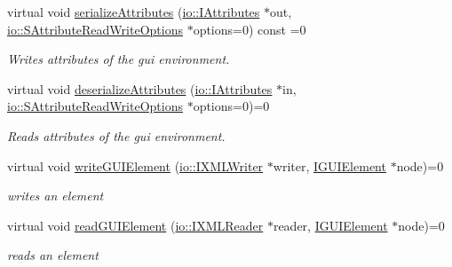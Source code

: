 \begin{DoxyCompactItemize}
virtual void \hyperlink{classirr_1_1gui_1_1IGUIEnvironment_a6342ec41dcd9fbd3f587dce369d11b34}{serialize\+Attributes} (\hyperlink{classirr_1_1io_1_1IAttributes}{io\+::\+I\+Attributes} $\ast$out, \hyperlink{structirr_1_1io_1_1SAttributeReadWriteOptions}{io\+::\+S\+Attribute\+Read\+Write\+Options} $\ast$options=0) const =0
\begin{DoxyCompactList}\small\item\em Writes attributes of the gui environment. \end{DoxyCompactList}\item 
\mbox{\label{classirr_1_1gui_1_1IGUIEnvironment_a8890a0b0cb5a08c9cca65c6efa3a1e0e}} 
virtual void \hyperlink{classirr_1_1gui_1_1IGUIEnvironment_a8890a0b0cb5a08c9cca65c6efa3a1e0e}{deserialize\+Attributes} (\hyperlink{classirr_1_1io_1_1IAttributes}{io\+::\+I\+Attributes} $\ast$in, \hyperlink{structirr_1_1io_1_1SAttributeReadWriteOptions}{io\+::\+S\+Attribute\+Read\+Write\+Options} $\ast$options=0)=0
\begin{DoxyCompactList}\small\item\em Reads attributes of the gui environment. \end{DoxyCompactList}\item 
\mbox{\label{classirr_1_1gui_1_1IGUIEnvironment_a30fb040bf48603fd309632e9c60b3583}} 
virtual void \hyperlink{classirr_1_1gui_1_1IGUIEnvironment_a30fb040bf48603fd309632e9c60b3583}{write\+G\+U\+I\+Element} (\hyperlink{classirr_1_1io_1_1IXMLWriter}{io\+::\+I\+X\+M\+L\+Writer} $\ast$writer, \hyperlink{classirr_1_1gui_1_1IGUIElement}{I\+G\+U\+I\+Element} $\ast$node)=0
\begin{DoxyCompactList}\small\item\em writes an element \end{DoxyCompactList}\item 
\mbox{\label{classirr_1_1gui_1_1IGUIEnvironment_acdfcdf6330e7475e3fdfd42f43c5f6df}} 
virtual void \hyperlink{classirr_1_1gui_1_1IGUIEnvironment_acdfcdf6330e7475e3fdfd42f43c5f6df}{read\+G\+U\+I\+Element} (\hyperlink{namespaceirr_1_1io_ab620b13630f0818f3eefc000f6917fe4}{io\+::\+I\+X\+M\+L\+Reader} $\ast$reader, \hyperlink{classirr_1_1gui_1_1IGUIElement}{I\+G\+U\+I\+Element} $\ast$node)=0
\begin{DoxyCompactList}\small\item\em reads an element \end{DoxyCompactList}\end{DoxyCompactItemize}
